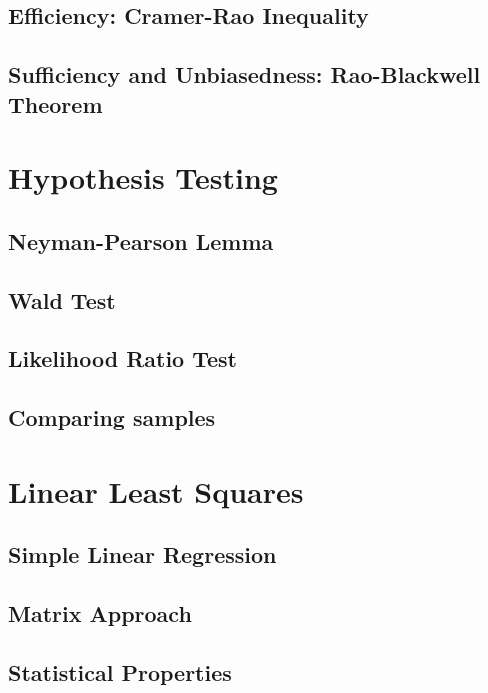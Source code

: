 \documentclass[
  openany]{book}
\begin{document}
\hypertarget{efficiency-cramer-rao-inequality}{%
\section{Efficiency: Cramer-Rao Inequality}\label{efficiency-cramer-rao-inequality}}

\hypertarget{sufficiency-and-unbiasedness-rao-blackwell-theorem}{%
\section{Sufficiency and Unbiasedness: Rao-Blackwell Theorem}\label{sufficiency-and-unbiasedness-rao-blackwell-theorem}}

\hypertarget{hypothesis-testing}{%
\chapter{Hypothesis Testing}\label{hypothesis-testing}}

\hypertarget{neyman-pearson-lemma}{%
\section{Neyman-Pearson Lemma}\label{neyman-pearson-lemma}}

\hypertarget{wald-test}{%
\section{Wald Test}\label{wald-test}}

\hypertarget{likelihood-ratio-test}{%
\section{Likelihood Ratio Test}\label{likelihood-ratio-test}}

\hypertarget{comparing-samples}{%
\section{Comparing samples}\label{comparing-samples}}

\hypertarget{linear-least-squares}{%
\chapter{Linear Least Squares}\label{linear-least-squares}}

\hypertarget{simple-linear-regression}{%
\section{Simple Linear Regression}\label{simple-linear-regression}}

\hypertarget{matrix-approach}{%
\section{Matrix Approach}\label{matrix-approach}}

\hypertarget{statistical-properties}{%
\section{Statistical Properties}\label{statistical-properties}}
\end{document}
